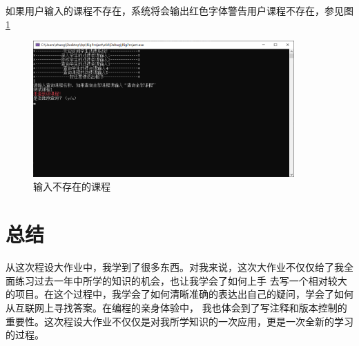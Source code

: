 \documentclass[fontset=windows]{article}
\begin{document}
如果用户输入的课程不存在，系统将会输出红色字体警告用户课程不存在，参见图\ref{ref20}
\newpage
\begin{figure}[h!]
	\begin{center}
		\includegraphics[width = 10cm]{case5 不存在课程.png}
		\caption{输入不存在的课程}
		\label{ref20}
	\end{center}
\end{figure}

\section{总结}
从这次程设大作业中，我学到了很多东西。对我来说，这次大作业不仅仅给了我全面练习过去一年中所学的知识的机会，也让我学会了如何上手
去写一个相对较大的项目。在这个过程中，我学会了如何清晰准确的表达出自己的疑问，学会了如何从互联网上寻找答案。在编程的亲身体验中，
我也体会到了写注释和版本控制的重要性。这次程设大作业不仅仅是对我所学知识的一次应用，更是一次全新的学习的过程。

\newpage

\appendix
\end{document}
